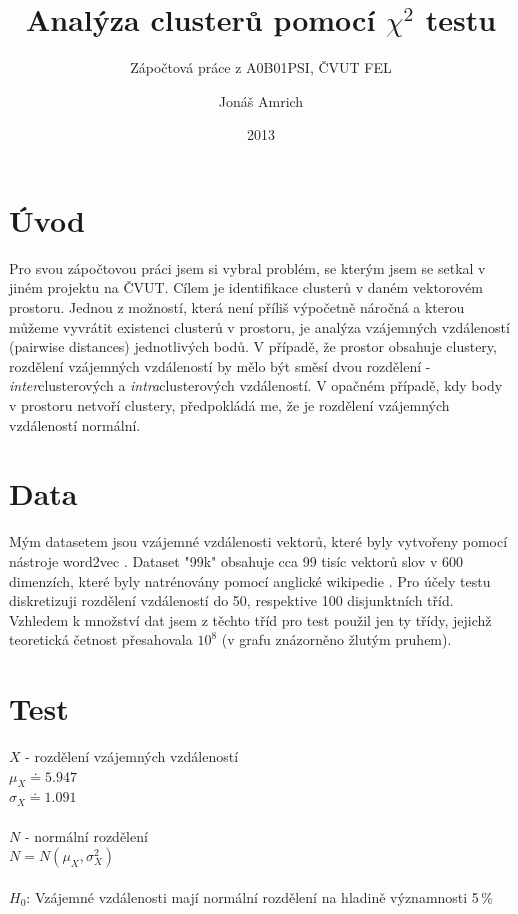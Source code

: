 \documentclass[fleqn,11pt]{article}
\title{Analýza clusterů pomocí $\chi^2$ testu}
\subtitle{Zápočtová práce z A0B01PSI, ČVUT FEL}
\author{Jonáš Amrich}
\date{2013}
\makeatletter
\newcommand*{\BreakableChar}[1][\MyBreakChar]{%
  \leavevmode%
  \prw@zbreak%
  \discretionary{\usebox#1}{}{}%
  \prw@zbreak%
}%
\makeatother
\begin{document}
    \maketitle
    \section{Úvod}
    Pro svou zápočtovou práci jsem si vybral problém, se kterým jsem se setkal v jiném projektu na ČVUT. Cílem je identifikace clusterů v daném vektorovém prostoru. Jednou z možností, která není příliš výpočetně náročná a kterou můžeme vyvrátit existenci clusterů v prostoru, je analýza vzájemných vzdáleností (pairwise distances) jednotlivých bodů. V případě, že prostor obsahuje clustery, rozdělení vzájemných vzdáleností by mělo být směsí dvou rozdělení - \textit{inter}clusterových a \textit{intra}clusterových vzdáleností. V opačném případě, kdy body v prostoru netvoří clustery, předpokládá\BreakableChar{}me, že je rozdělení vzájemných vzdáleností normální.

    \section{Data}
    Mým datasetem jsou vzájemné vzdálenosti vektorů, které byly vytvořeny pomocí nástroje word2vec \cite{mikolov2013efficient}. Dataset "99k" obsahuje cca 99 tisíc vektorů slov v 600 dimenzích, které byly natrénovány pomocí anglické wikipedie \cite{wiki}.
    Pro účely testu diskretizuji rozdělení vzdáleností do 50, respektive 100 disjunktních tříd. Vzhledem k množství dat jsem z těchto tříd pro test použil jen ty třídy, jejichž teoretická četnost přesahovala $10^8$ (v grafu znázorněno žlutým pruhem).

    \section{Test}

    $X$ - rozdělení vzájemných vzdáleností\\
    $\mu_X \doteq 5.947$\\
    $\sigma_X \doteq 1.091$\\
    \\
    $N$ - normální rozdělení\\
    $N = N(\mu_X, \sigma_X^2)$\\
    \\
    $H_0$: Vzájemné vzdálenosti mají normální rozdělení na hladině významnosti 5\,\%\\
\end{document}
